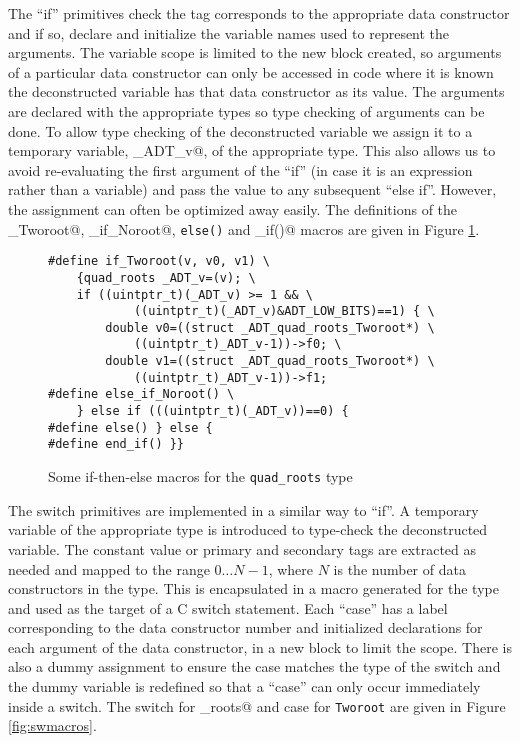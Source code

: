 The ``if'' primitives check the tag corresponds to the appropriate data
constructor and if so, declare and initialize the variable names used
to represent the arguments.  The variable scope is limited to the new
block created, so arguments of a particular data constructor can only
be accessed in code where it is known the deconstructed variable has
that data constructor as its value.  The arguments are declared with the
appropriate types so type checking of arguments can be done.  To allow
type checking of the deconstructed variable we assign it to a temporary
variable, \verb@_ADT_v@, of the appropriate type.  This also allows us
to avoid re-evaluating the first argument of the ``if'' (in case it is
an expression rather than a variable) and pass the value to any
subsequent ``else if''.  However, the assignment can often be optimized
away easily.  The definitions of
the \verb@if_Tworoot@, \verb@else_if_Noroot@, \texttt{else()} and
\verb@end_if()@ macros are given in Figure \ref{fig:itemacros}.

\begin{figure}
\begin{verbatim}
#define if_Tworoot(v, v0, v1) \
    {quad_roots _ADT_v=(v); \
    if ((uintptr_t)(_ADT_v) >= 1 && \
            ((uintptr_t)(_ADT_v)&ADT_LOW_BITS)==1) { \
        double v0=((struct _ADT_quad_roots_Tworoot*) \
            ((uintptr_t)_ADT_v-1))->f0; \
        double v1=((struct _ADT_quad_roots_Tworoot*) \
            ((uintptr_t)_ADT_v-1))->f1;
#define else_if_Noroot() \
    } else if (((uintptr_t)(_ADT_v))==0) {
#define else() } else {
#define end_if() }}
\end{verbatim}
\caption{Some if-then-else macros for the \texttt{quad\_roots} type}
\label{fig:itemacros}
\end{figure}

The switch primitives are implemented in a similar way to ``if''.
A temporary variable of the appropriate type is introduced to type-check
the deconstructed variable.  The constant value or primary and secondary
tags are extracted as needed and mapped to the range $0 \ldots N-1$, where
$N$ is the number of data constructors in the type. This is encapsulated
in a macro generated for the type and used as the
target of a C switch statement.  Each ``case'' has a label corresponding
to the data constructor number and initialized declarations for each
argument of the data constructor, in a new block to limit the scope.
There is also a dummy assignment to ensure the case matches the type of
the switch and the dummy variable is redefined so that a ``case'' can
only occur immediately inside a switch.  The switch for \verb@quad_roots@
and case for \texttt{Tworoot} are given in Figure \ref{fig:swmacros}.

